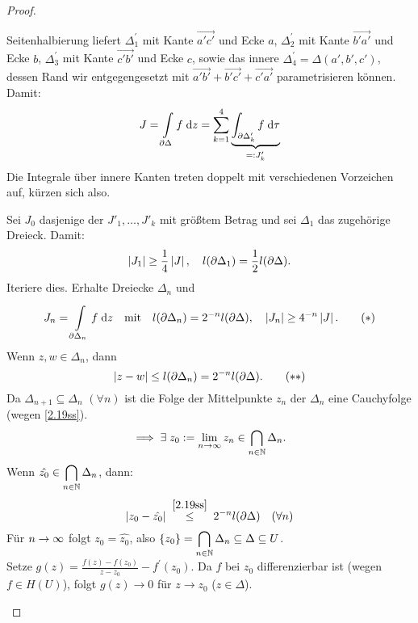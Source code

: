 \documentclass[a4paper,twoside,DIV15,BCOR12mm]{scrbook}
\begin{document}
\begin{proof}
\begin{enumerate}[label=(\arabic*),ref=(\arabic*)]
\begin{center}
\begin{tikzpicture}[scale=3]
\end{tikzpicture}
\end{center}

Seitenhalbierung liefert $\Delta_1^\prime$ mit Kante $\overrightarrow{a' c'}$ und Ecke $a$, $\Delta_2^\prime$ mit Kante $\overrightarrow{b' a'}$ und Ecke $b$, $\Delta_3^\prime$ mit Kante $\overrightarrow{c' b'}$ und Ecke $c$, sowie das innere $\Delta_4^\prime = \Delta(a',b',c')$, dessen Rand wir entgegengesetzt mit $\overrightarrow{a'b'} + \overrightarrow{b'c'}+\overrightarrow{c' a'}$ parametrisieren können. Damit:
\[J=\Integral{\partial\Delta}{}{f}{z} = \sum_{k=1}^4\underbrace{\integral{\partial\Delta'_k}{}{f}{\tau}}_{\ad J'_k}\]
Die Integrale über innere Kanten treten doppelt mit verschiedenen Vorzeichen auf, kürzen sich also.

Sei $J_0$ dasjenige der $J'_1,\dotsc,J'_k$ mit größtem Betrag und sei $\Delta_1$ das zugehörige Dreieck. Damit:
\[\abs{J_1}\geq\frac{1}{4}\abs{J},\quad l(\partial\Delta_1)=\frac{1}{2}l(\partial\Delta).\]
Iteriere dies. Erhalte Dreiecke $\Delta_n$ und
\[\label{2.19s}J_n = \Integral{\partial\Delta_n}{}{f}{z}\quad\text{mit}\quad l(\partial\Delta_n)=2^{-n}l(\partial\Delta),\quad\abs{J_n}\geq 4^{-n}\abs{J}.\tag{$*$}\]
Wenn $z,w\in\Delta_n$, dann
\[\label{2.19ss}\abs{z-w}\leq l(\partial\Delta_n) = 2^{-n}l(\partial\Delta).\tag{$**$}\]
Da $\Delta_{n+1}\subseteq \Delta_n$ $(\forall n)$ ist die Folge der Mittelpunkte $z_n$ der $\Delta_n$ eine Cauchyfolge (wegen \eqref{2.19ss}).
\[\folgt\exists\; z_0\da \lim_{n\ra\infty}z_n\in\bigcap_{\nat{n}}\Delta_n.\]
Wenn $\displaystyle \hat{z_0}\in\bigcap_{\nat{n}}\Delta_n$, dann:
\[\abs{z_0-\hat{z_0}}\wegen{\leq}{\eqref{2.19ss}}2^{-n}l(\partial\Delta)\quad(\forall n)\]
Für $n\ra\infty$ folgt $z_0 = \hat{z_0}$, also $\displaystyle\{z_0\}=\bigcap_{\nat{n}}\Delta_n\subseteq\Delta\subseteq U$.\\
Setze $\displaystyle g(z)=\frac{f(z)-f(z_0)}{z-z_0}-f^\prime(z_0)$. Da $f$ bei $z_0$ differenzierbar ist (wegen $f\in H(U)$),
folgt $g(z)\to0$ für $z\to z_0$ ($z\in\Delta$).


\end{enumerate}
\end{proof}
\end{document}
